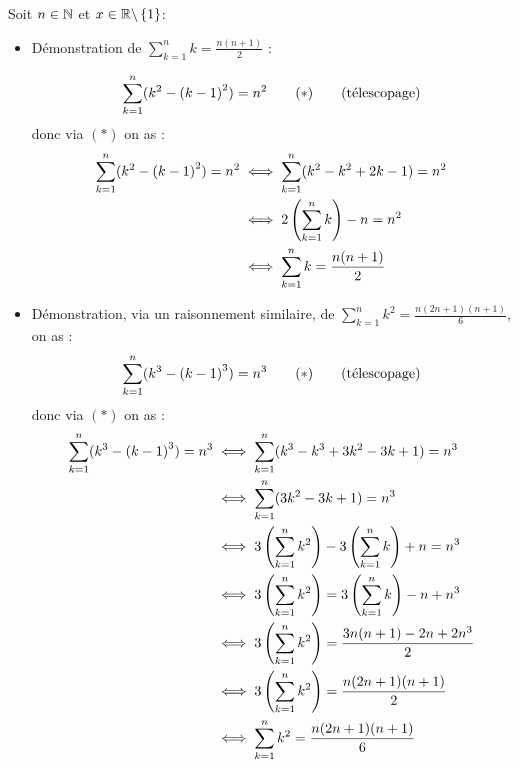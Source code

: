 \begin{dem}
	Soit \(n \in \mathbb{N}\) et \(x\in\mathbb{R}\backslash\left\lbrace1\right\rbrace\):
	\begin{itemize}
		\item Démonstration de \(\sum_{k=1}^n k = \frac{n(n+1)}{2}\) :

		      \[
			      \sum_{k=1}^n (k^2-\paren{k-1}^2) = n^2 \qquad (*) \qquad \hfill \text{(télescopage)}
		      \]
		      donc via \((*)\) on as :
		      \begin{align*}
			      \sum_{k=1}^n (k^2-\left(k-1\right)^2) = n^2 & \iff \sum_{k=1}^n (k^2-k^2+2k-1) = n^2 \\
			                                             & \iff 2\left(\sum_{k=1}^n k\right) -n = n^2  \\
			                                             & \iff \sum_{k=1}^n k = \frac{n(n+1)}{2} \\
		      \end{align*}
		\item Démonstration, via un raisonnement similaire, de \(\sum_{k=1}^n k^2 = \frac{n(2n+1)(n+1)}{6}\), on as :
		      \[
			      \sum_{k=1}^n (k^3-\paren{k-1}^3) = n^3 \qquad (*) \qquad \hfill \text{(télescopage)}
		      \]
		      donc via \((*)\) on as :
		      \begin{align*}
			      \sum_{k=1}^n (k^3-\left(k-1\right)^3) = n^3 & \iff \sum_{k=1}^n (k^3-k^3 + 3k^2-3k+1) = n^3                      \\
			                                             & \iff \sum_{k=1}^n (3k^2-3k+1)  = n^3                               \\
			                                             & \iff 3\left(\sum_{k=1}^n k^2\right) -3\left(\sum_{k=1}^{n}k\right) + n =n^3  \\
			                                             & \iff 3\left(\sum_{k=1}^n k^2\right) = 3\left(\sum_{k=1}^{n}k\right) - n +n^3 \\
			                                             & \iff 3\left(\sum_{k=1}^n k^2\right) = \frac{3n(n+1)-2n+2n^3}{2}         \\
			                                             & \iff 3\left(\sum_{k=1}^n k^2\right) = \frac{n(2n+1)(n+1)}{2}            \\
			                                             & \iff \sum_{k=1}^n k^2 = \frac{n(2n+1)(n+1)}{6}                     \\
		      \end{align*}


\end{itemize}
\end{dem}
